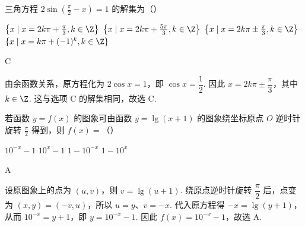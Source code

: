 \begin{problem}
三角方程 \(2\sin \left(\frac{\pi}{2} - x\right) = 1\) 的解集为（\quad）

\choices
    {\(\left\{x \mid x = 2k\pi + \frac{\pi}{3}, k \in \Z\right\}\)}
    {\(\left\{x \mid x = 2k\pi + \frac{5\pi}{3}, k \in \Z\right\}\)}
    {\(\left\{x \mid x = 2k\pi \pm \frac{\pi}{3}, k \in \Z\right\}\)}
    {\(\{x\mid x = k\pi +(-1)^k,k\in \Z\}\)}
\end{problem}

\begin{answer}
C
\end{answer}

\begin{solution}
由余函数关系，原方程化为 \(2\cos x=1\)，即 \(\cos x=\dfrac12\). 因此
\(x=2k\pi\pm\dfrac{\pi}{3}\)，其中 \(k\in\Z\). 这与选项 C 的解集相同，故选 C.
\end{solution}

\begin{problem}
若函数 \( y = f(x) \) 的图象可由函数 \( y = \lg (x + 1) \) 的图象绕坐标原点 \(O\) 逆时针旋转 \( \frac{\pi}{2} \) 得到，则 \( f(x) = \)（\quad）

\choices
    {\(10^{-x} - 1\)}
    {\(10^{x} - 1\)}
    {\(1 - 10^{-x}\)}
    {\(1 - 10^{x}\)}
\end{problem}

\begin{answer}
A
\end{answer}

\begin{solution}
设原图象上的点为 \((u,v)\)，则 \(v=\lg(u+1)\). 绕原点逆时针旋转 \(\dfrac{\pi}{2}\) 后，点变为 \((x,y)=(-v,u)\)，所以 \(u=y\)、\(v=-x\). 代入原方程得 \(-x=\lg(y+1)\)，从而 \(10^{-x}=y+1\)，即 \(y=10^{-x}-1\). 因此 \(f(x)=10^{-x}-1\)，故选 A.
\end{solution}

